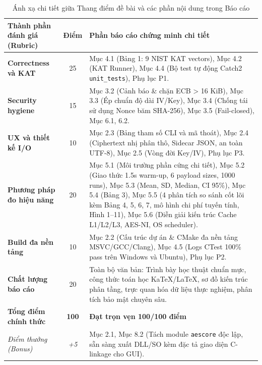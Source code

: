 \documentclass[12pt, a4paper]{report}
\begin{document}
\begin{table}[H]
\centering
\small
\caption{Ánh xạ chi tiết giữa Thang điểm đề bài và các phần nội dung trong Báo cáo}
\label{tab:rubric_mapping}
\begin{tabular}{p{5.5cm} c p{8.5cm}}
\toprule
\textbf{Thành phần đánh giá (Rubric)} & \textbf{Điểm} & \textbf{Phần báo cáo chứng minh chi tiết} \\
\midrule
\textbf{Correctness và KAT} & 25 & Mục 4.1 (Bảng 1: 9 NIST KAT vectors), Mục 4.2 (KAT Runner), Mục 4.4 (Bộ test tự động Catch2 \texttt{unit\_tests}), Phụ lục P1. \\
\midrule
\textbf{Security hygiene} & 15 & Mục 3.2 (Cảnh báo \& chặn ECB > 16 KiB), Mục 3.3 (Ép chuẩn độ dài IV/Key), Mục 3.4 (Chống tái sử dụng Nonce băm SHA-256), Mục 3.5 (Fail-closed), Mục 6.1, 6.2. \\
\midrule
\textbf{UX và thiết kế I/O} & 10 & Mục 2.3 (Bảng tham số CLI và mã thoát), Mục 2.4 (Ciphertext nhị phân thô, Sidecar JSON, an toàn UTF-8), Mục 2.5 (Vòng đời Key/IV), Phụ lục P3. \\
\midrule
\textbf{Phương pháp đo hiệu năng} & 20 & Mục 5.1 (Môi trường phần cứng chi tiết), Mục 5.2 (Giao thức 1.5s warm-up, 6 payload sizes, 1000 runs), Mục 5.3 (Mean, SD, Median, CI 95\%), Mục 5.4 (Bảng 3), Mục 5.5 (4 phân tích so sánh cốt lõi kèm Bảng 4, 5, 6, 7, mô hình chi phí tuyến tính, Hình 1--11), Mục 5.6 (Diễn giải kiến trúc Cache L1/L2/L3, AES-NI, OS scheduler). \\
\midrule
\textbf{Build đa nền tảng} & 10 & Mục 2.2 (Cấu trúc dự án \& CMake đa nền tảng MSVC/GCC/Clang), Mục 4.5 (Logs CTest 100\% pass trên Windows và Ubuntu), Phụ lục P2. \\
\midrule
\textbf{Chất lượng báo cáo} & 20 & Toàn bộ văn bản: Trình bày học thuật chuẩn mực, công thức toán học KaTeX/LaTeX, sơ đồ kiến trúc phân tầng, trực quan hóa dữ liệu thực nghiệm, phân tích bảo mật chuyên sâu. \\
\midrule
\textbf{Tổng điểm chính thức} & \textbf{100} & \textbf{Đạt trọn vẹn 100/100 điểm} \\
\midrule
\textit{Điểm thưởng (Bonus)} & \textit{+5} & Mục 2.1, Mục 8.2 (Tách module \texttt{aescore} độc lập, sẵn sàng xuất DLL/SO kèm đặc tả giao diện C-linkage cho GUI). \\
\bottomrule
\end{tabular}
\end{table}
\end{document}
